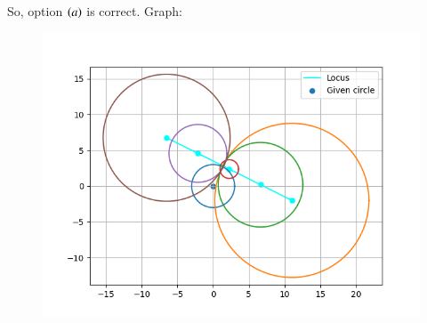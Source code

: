 \documentclass[journal,12pt,onecolumn]{IEEEtran}
\begin{document}
So, option \textbf{$\left(a\right)$} is correct.
	Graph:
\begin{figure}[h!]
	\centering
	\includegraphics[width=0.7\linewidth]{img2.png}
\end{figure}
\end{document}
